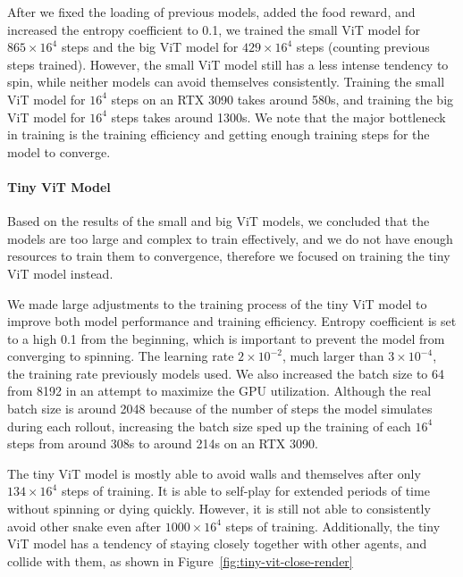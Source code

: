 \documentclass[conference]{IEEEtran}
\begin{document}
After we fixed the loading of previous models, added the food reward,
and increased the entropy coefficient to 0.1,
we trained the small ViT model for $865\times 16^4$ steps and the big ViT model
for $429\times 16^4$ steps (counting previous steps trained). However,
the small ViT model still has a less intense tendency to spin,
while neither models can avoid themselves consistently.
Training the small ViT model for $16^4$ steps on an RTX 3090 takes around 580s,
and training the big ViT model for $16^4$ steps takes around 1300s.
We note that the major bottleneck in training is the training efficiency and
getting enough training steps for the model to converge.

\paragraph{Tiny ViT Model}
Based on the results of the small and big ViT models,
we concluded that the models are too large and complex to train effectively,
and we do not have enough resources to train them to convergence,
therefore we focused on training the tiny ViT model instead.

We made large adjustments to the training process of the tiny ViT model to
improve both model performance and training efficiency.
Entropy coefficient is set to a high 0.1 from the beginning,
which is important to prevent the model from converging to spinning.
The learning rate $2\times 10^{-2}$, much larger than $3\times 10^{-4}$,
the training rate previously models used.
We also increased the batch size to 64 from 8192 in an attempt to maximize the
GPU utilization.
Although the real batch size is around 2048 because of the number of steps the
model simulates during each rollout,
increasing the batch size sped up the training of each $16^4$ steps from around
308s to around 214s on an RTX 3090.

The tiny ViT model is mostly able to avoid walls and themselves after only
$134\times 16^4$ steps of training.
It is able to self-play for extended periods of time without spinning or dying
quickly. However,
it is still not able to consistently avoid other snake even after $1000\times
    16^4$ steps of training. Additionally,
the tiny ViT model has a tendency of staying closely together with other agents,
and collide with them, as shown in Figure~\ref{fig:tiny-vit-close-render}
\end{document}
